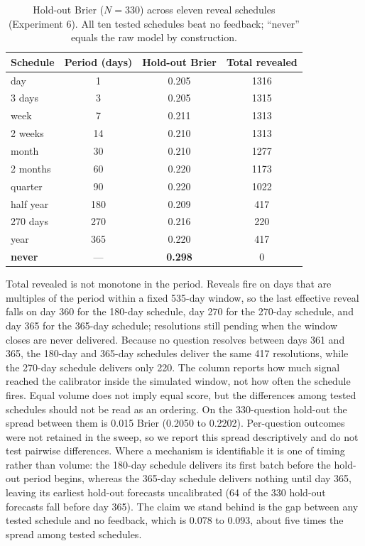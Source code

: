 \documentclass[11pt]{article}
\begin{document}
\begin{table}[!htbp]
\centering
\caption{Hold-out Brier ($N=330$) across eleven reveal schedules (Experiment 6).
All ten tested schedules beat no feedback; ``never'' equals the raw model by
construction.}
\label{tab:sweep}
\begin{tabular}{lccc}
\toprule
Schedule & Period (days) & Hold-out Brier & Total revealed \\
\midrule
day       & 1   & 0.205 & 1316 \\
3 days    & 3   & 0.205 & 1315 \\
week      & 7   & 0.211 & 1313 \\
2 weeks   & 14  & 0.210 & 1313 \\
month     & 30  & 0.210 & 1277 \\
2 months  & 60  & 0.220 & 1173 \\
quarter   & 90  & 0.220 & 1022 \\
half year & 180 & 0.209 & 417 \\
270 days  & 270 & 0.216 & 220 \\
year      & 365 & 0.220 & 417 \\
\textbf{never} & --- & \textbf{0.298} & 0 \\
\bottomrule
\end{tabular}

\parbox{0.92\linewidth}{\footnotesize Total revealed is not monotone in the
period. Reveals fire on days that are multiples of the period within a fixed
535-day window, so the last effective reveal falls on day 360 for the 180-day
schedule, day 270 for the 270-day schedule, and day 365 for the 365-day
schedule; resolutions still pending when the window closes are never delivered.
Because no question resolves between days 361 and 365, the 180-day and 365-day
schedules deliver the same 417 resolutions, while the 270-day schedule delivers
only 220. The column reports how much signal reached the calibrator inside the
simulated window, not how often the schedule fires.
Equal volume does not imply equal score, but the differences among tested
schedules should not be read as an ordering. On the 330-question hold-out the
spread between them is 0.015 Brier (0.2050 to 0.2202). Per-question outcomes
were not retained in the sweep, so we report this spread descriptively and do
not test pairwise differences. Where a mechanism
is identifiable it is one of timing rather than volume:
the 180-day schedule delivers its first batch before the hold-out period begins,
whereas the 365-day schedule delivers nothing until day 365, leaving its
earliest hold-out forecasts uncalibrated (64 of the 330 hold-out forecasts fall
before day 365). The claim we stand behind is the gap
between any tested schedule and no feedback, which is 0.078 to 0.093,
about five times the spread among tested schedules.}
\end{table}
\end{document}
